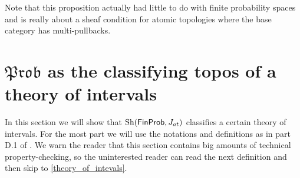 \documentclass[a4paper]{amsproc}
\theoremstyle{plain}
\theoremstyle{definition}
\theoremstyle{remark}
\numberwithin{equation}{section}
\DeclareMathOperator{\Sh}{Sh}
\newcommand{\FinProb}{\textup{\textsf{FinProb}}}
\newcommand{\Prob}{\mathfrak{Prob}}
\begin{document}
Note that this proposition actually had little to do with finite probability spaces and is really about a sheaf condition for atomic topologies where the base category has multi-pullbacks.

\section{$\Prob$ as the classifying topos of a theory of intervals}

In this section we will show that $\Sh(\FinProb, J_{at})$ classifies a certain theory of intervals. For the most part we will use the notations and definitions as in part D.1 of \cite{elephant}. We warn the reader that this section contains big amounts of technical property-checking, so the uninterested reader can read the next definition and then skip to \ref{theory_of_intevals}.
\end{document}
